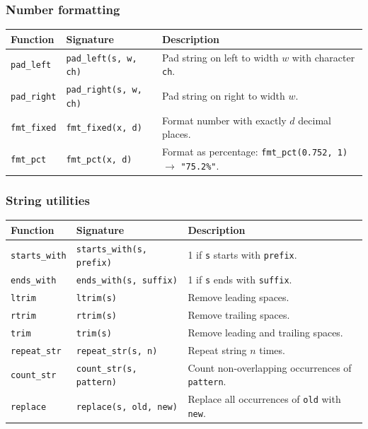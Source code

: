 \documentclass[11pt,a4paper]{article}
\begin{document}
\subsubsection{Number formatting}

\begin{longtable}{@{}L{3.5cm}L{4.5cm}L{6.5cm}@{}}
\toprule
\textbf{Function} & \textbf{Signature} & \textbf{Description} \\
\midrule
\endhead
\texttt{pad\_left}  & \texttt{pad\_left(s, w, ch)}    & Pad string on left to width $w$ with character \texttt{ch}. \\
\texttt{pad\_right} & \texttt{pad\_right(s, w, ch)}   & Pad string on right to width $w$. \\
\texttt{fmt\_fixed} & \texttt{fmt\_fixed(x, d)}       & Format number with exactly $d$ decimal places. \\
\texttt{fmt\_pct}   & \texttt{fmt\_pct(x, d)}         & Format as percentage: \texttt{fmt\_pct(0.752, 1)} $\to$ \texttt{"75.2\%"}. \\
\bottomrule
\end{longtable}

\subsubsection{String utilities}

\begin{longtable}{@{}L{3.5cm}L{4.5cm}L{6.5cm}@{}}
\toprule
\textbf{Function} & \textbf{Signature} & \textbf{Description} \\
\midrule
\endhead
\texttt{starts\_with} & \texttt{starts\_with(s, prefix)}   & 1 if \texttt{s} starts with \texttt{prefix}. \\
\texttt{ends\_with}   & \texttt{ends\_with(s, suffix)}     & 1 if \texttt{s} ends with \texttt{suffix}. \\
\texttt{ltrim}        & \texttt{ltrim(s)}                  & Remove leading spaces. \\
\texttt{rtrim}        & \texttt{rtrim(s)}                  & Remove trailing spaces. \\
\texttt{trim}         & \texttt{trim(s)}                   & Remove leading and trailing spaces. \\
\texttt{repeat\_str}  & \texttt{repeat\_str(s, n)}         & Repeat string $n$ times. \\
\texttt{count\_str}   & \texttt{count\_str(s, pattern)}    & Count non-overlapping occurrences of \texttt{pattern}. \\
\texttt{replace}      & \texttt{replace(s, old, new)}      & Replace all occurrences of \texttt{old} with \texttt{new}. \\
\bottomrule
\end{longtable}
\end{document}
